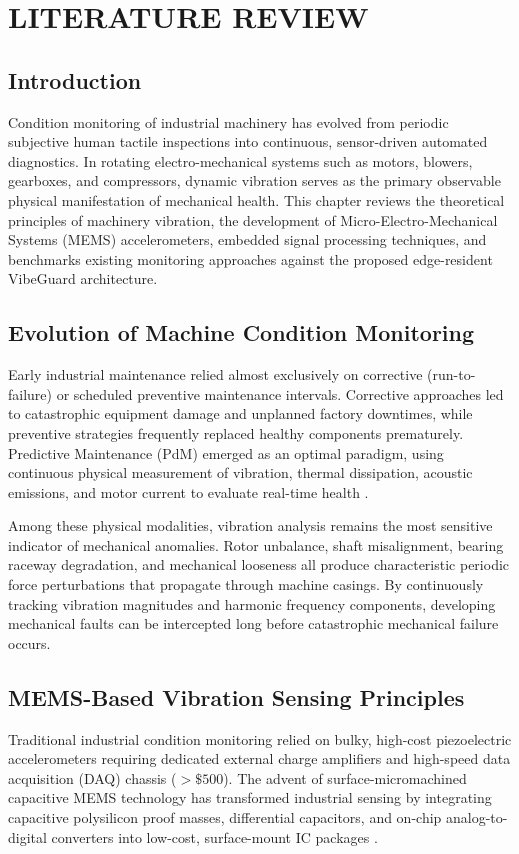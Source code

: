 \chapter{LITERATURE REVIEW}
\label{ch:literature_review}

\section{Introduction}
\hspace{2em}Condition monitoring of industrial machinery has evolved from periodic subjective human tactile inspections into continuous, sensor-driven automated diagnostics. In rotating electro-mechanical systems such as motors, blowers, gearboxes, and compressors, dynamic vibration serves as the primary observable physical manifestation of mechanical health. This chapter reviews the theoretical principles of machinery vibration, the development of Micro-Electro-Mechanical Systems (MEMS) accelerometers, embedded signal processing techniques, and benchmarks existing monitoring approaches against the proposed edge-resident VibeGuard architecture.

\section{Evolution of Machine Condition Monitoring}
\hspace{2em}Early industrial maintenance relied almost exclusively on corrective (run-to-failure) or scheduled preventive maintenance intervals. Corrective approaches led to catastrophic equipment damage and unplanned factory downtimes, while preventive strategies frequently replaced healthy components prematurely. Predictive Maintenance (PdM) emerged as an optimal paradigm, using continuous physical measurement of vibration, thermal dissipation, acoustic emissions, and motor current to evaluate real-time health \cite{randall2011}.

\hspace{2em}Among these physical modalities, vibration analysis remains the most sensitive indicator of mechanical anomalies. Rotor unbalance, shaft misalignment, bearing raceway degradation, and mechanical looseness all produce characteristic periodic force perturbations that propagate through machine casings. By continuously tracking vibration magnitudes and harmonic frequency components, developing mechanical faults can be intercepted long before catastrophic mechanical failure occurs.

\section{MEMS-Based Vibration Sensing Principles}
\hspace{2em}Traditional industrial condition monitoring relied on bulky, high-cost piezoelectric accelerometers requiring dedicated external charge amplifiers and high-speed data acquisition (DAQ) chassis ($>\$500$). The advent of surface-micromachined capacitive MEMS technology has transformed industrial sensing by integrating capacitive polysilicon proof masses, differential capacitors, and on-chip analog-to-digital converters into low-cost, surface-mount IC packages \cite{adxl345}.

